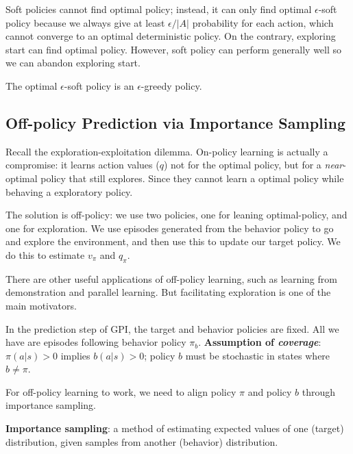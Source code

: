 \documentclass[sutton_barto_notes.tex]{subfiles}
\begin{document}
Soft policies cannot find optimal policy; instead, it can only find optimal $\epsilon$-soft policy because we always give at least $\epsilon / |A|$ probability for each action, which cannot converge to an optimal deterministic policy. On the contrary, exploring start can find optimal policy. However, soft policy can perform generally well so we can abandon exploring start.

The optimal $\epsilon$-soft policy is an $\epsilon$-greedy policy.

\subsection{Off-policy Prediction via Importance Sampling}

Recall the exploration-exploitation dilemma. On-policy learning is actually a compromise: it learns action values ($q$) not for the optimal policy, but for a \textit{near}-optimal policy that still explores. Since they cannot learn a optimal policy while behaving a exploratory policy.

The solution is off-policy: we use two policies, one for leaning optimal-policy, and one for exploration. We use episodes generated from the behavior policy to go and explore the environment, and then use this to update our target policy. We do this to estimate $v_\pi$ and $q_\pi$.

There are other useful applications of off-policy learning, such as learning from demonstration and parallel learning. But facilitating exploration is one of the main motivators.

In the prediction step of GPI, the target and behavior policies are fixed. All we have are episodes following behavior policy $\pi_b$. \textbf{Assumption of \textit{coverage}}: $\pi(a|s) > 0$ implies $b(a|s) > 0$; policy $b$ must be stochastic in states where $b \neq \pi$.

For off-policy learning to work, we need to align policy $\pi$ and policy $b$ through importance sampling.
\begin{definition}
\textbf{Importance sampling}: a method of estimating expected values of one (target) distribution, given samples from another (behavior) distribution.
\end{definition}
\end{document}

